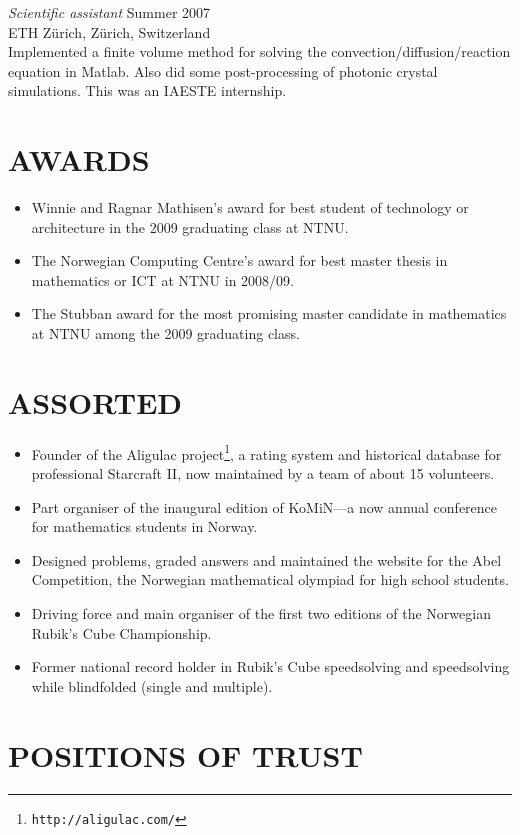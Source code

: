 \documentclass[line,margin]{res}
\newcommand{\zh}{Z\"{u}rich}
\begin{document}
\begin{resume}
{\em Scientific assistant} \hfill Summer 2007 \\
ETH \zh, \zh, Switzerland \\
Implemented a finite volume method for solving the convection/diffusion/reaction equation in
Matlab. Also did some post-processing of photonic crystal simulations. This was an IAESTE
internship.

\section{AWARDS}

\begin{itemize}
\item Winnie and Ragnar Mathisen's award for best student of technology
  or architecture in the 2009 graduating class at NTNU.
\item The Norwegian Computing Centre's award for best master thesis in
  mathematics or ICT at NTNU in 2008/09.
\item The Stubban award for the most promising master candidate in
  mathematics at NTNU among the 2009 graduating class.
\end{itemize}


\section{ASSORTED}

\begin{itemize}
\item Founder of the Aligulac project\footnote{{\tt http://aligulac.com/}}, a rating system and
  historical database for professional Starcraft II, now maintained by a team of about 15 volunteers.
\item Part organiser of the inaugural edition of KoMiN---a now annual conference for mathematics
  students in Norway.
\item Designed problems, graded answers and maintained the website for the Abel Competition, the
  Norwegian mathematical olympiad for high school students.
\item Driving force and main organiser of the first two editions of the Norwegian Rubik's Cube
  Championship.
\item Former national record holder in Rubik's Cube speedsolving and speedsolving while blindfolded
  (single and multiple).
\end{itemize}


\section{POSITIONS OF TRUST}


\end{resume}
\end{document}
